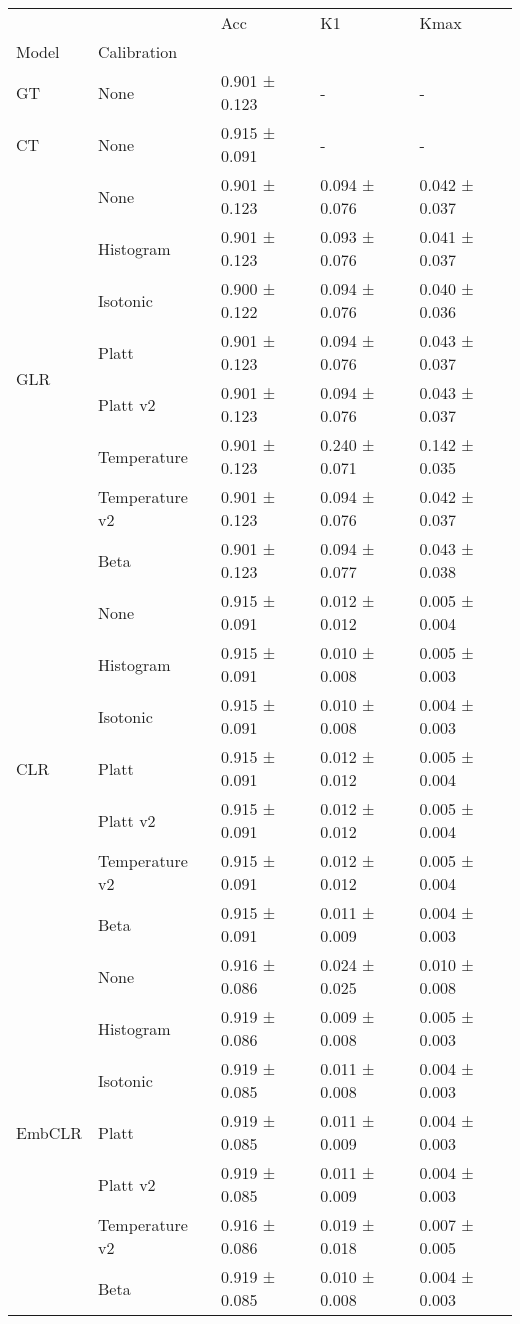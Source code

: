 \begin{tabular}{lllll}
\toprule
 &  & Acc & K1 & Kmax \\
Model & Calibration &  &  &  \\
\midrule
GT & None & 0.901 ± 0.123 & - & - \\
\cline{1-5}
CT & None & 0.915 ± 0.091 & - & - \\
\cline{1-5}
\multirow[t]{8}{*}{GLR} & None & 0.901 ± 0.123 & 0.094 ± 0.076 & 0.042 ± 0.037 \\
 & Histogram & 0.901 ± 0.123 & 0.093 ± 0.076 & 0.041 ± 0.037 \\
 & Isotonic & 0.900 ± 0.122 & 0.094 ± 0.076 & 0.040 ± 0.036 \\
 & Platt & 0.901 ± 0.123 & 0.094 ± 0.076 & 0.043 ± 0.037 \\
 & Platt v2 & 0.901 ± 0.123 & 0.094 ± 0.076 & 0.043 ± 0.037 \\
 & Temperature & 0.901 ± 0.123 & 0.240 ± 0.071 & 0.142 ± 0.035 \\
 & Temperature v2 & 0.901 ± 0.123 & 0.094 ± 0.076 & 0.042 ± 0.037 \\
 & Beta & 0.901 ± 0.123 & 0.094 ± 0.077 & 0.043 ± 0.038 \\
\cline{1-5}
\multirow[t]{7}{*}{CLR} & None & 0.915 ± 0.091 & 0.012 ± 0.012 & 0.005 ± 0.004 \\
 & Histogram & 0.915 ± 0.091 & 0.010 ± 0.008 & 0.005 ± 0.003 \\
 & Isotonic & 0.915 ± 0.091 & 0.010 ± 0.008 & 0.004 ± 0.003 \\
 & Platt & 0.915 ± 0.091 & 0.012 ± 0.012 & 0.005 ± 0.004 \\
 & Platt v2 & 0.915 ± 0.091 & 0.012 ± 0.012 & 0.005 ± 0.004 \\
 & Temperature v2 & 0.915 ± 0.091 & 0.012 ± 0.012 & 0.005 ± 0.004 \\
 & Beta & 0.915 ± 0.091 & 0.011 ± 0.009 & 0.004 ± 0.003 \\
\cline{1-5}
\multirow[t]{7}{*}{EmbCLR} & None & 0.916 ± 0.086 & 0.024 ± 0.025 & 0.010 ± 0.008 \\
 & Histogram & 0.919 ± 0.086 & 0.009 ± 0.008 & 0.005 ± 0.003 \\
 & Isotonic & 0.919 ± 0.085 & 0.011 ± 0.008 & 0.004 ± 0.003 \\
 & Platt & 0.919 ± 0.085 & 0.011 ± 0.009 & 0.004 ± 0.003 \\
 & Platt v2 & 0.919 ± 0.085 & 0.011 ± 0.009 & 0.004 ± 0.003 \\
 & Temperature v2 & 0.916 ± 0.086 & 0.019 ± 0.018 & 0.007 ± 0.005 \\
 & Beta & 0.919 ± 0.085 & 0.010 ± 0.008 & 0.004 ± 0.003 \\
\cline{1-5}
\bottomrule
\end{tabular}
